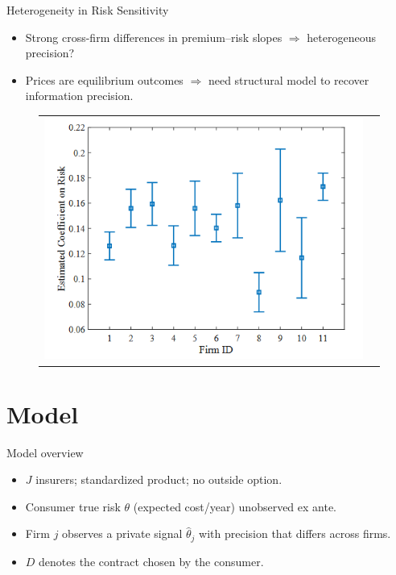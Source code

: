 \documentclass[10pt,aspectratio=169]{beamer}
\begin{document}
\begin{frame}{Heterogeneity in Risk Sensitivity}
\justifying
\begin{itemize}
  \item Strong cross-firm differences in premium–risk slopes $\Rightarrow$ heterogeneous precision? 
  \item Prices are equilibrium outcomes $\Rightarrow$ need structural model to recover information precision.
\end{itemize}
\vspace{0.75em}
\begin{figure}[H]
\centering{}%
\begin{tabular}{cc}
\includegraphics[scale=0.45]{Figures/Fig2.png}
\end{tabular}
\end{figure}
\end{frame}

\section{Model}

\begin{frame}{Model overview}
\justifying
\begin{itemize}
  \item $J$ insurers; standardized product; no outside option.
  \item Consumer true risk $\theta$ (expected cost/year) unobserved ex ante.
  \item Firm $j$ observes a private signal $\hat{\theta}_j$ with precision that differs across firms.
  \item $D$ denotes the contract chosen by the consumer.
\end{itemize}
\end{frame}
\end{document}
